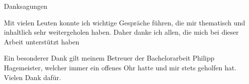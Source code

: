 \begin{center} 


\huge Danksagungen

\end{center}
Mit vielen Leuten konnte ich wichtige Gespräche führen, die mir thematisch und inhaltlich sehr weitergeholen haben. Daher danke ich allen, die mich bei dieser Arbeit unterstützt haben\par
Ein besonderer Dank gilt meinem Betreuer der Bachelorarbeit Philipp Hagemeister, welcher immer ein offenes Ohr hatte und mir stets geholfen hat. Vielen Dank dafür.